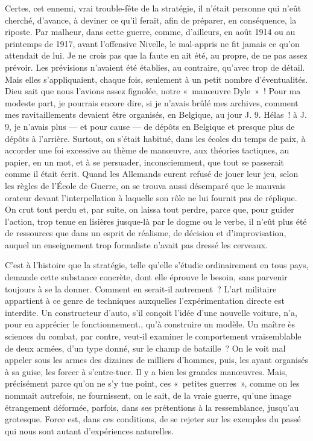 \documentclass[french,twoside]{book} %
\begin{document}
Certes, cet ennemi, vrai trouble-fête de la stratégie, il n’était personne qui n’eût cherché, d’avance, à deviner ce qu’il ferait, afin de préparer, en conséquence, la riposte. Par malheur, dans cette guerre, comme, d’ailleurs, en août 1914 ou au printemps de 1917, avant l’offensive Nivelle, le mal-appris ne fit jamais ce qu’on attendait de lui. Je ne crois pas que la faute en ait été, au propre, de ne pas assez prévoir. Les prévisions n’avaient été établies, au contraire, qu’avec trop de détail. Mais elles s’appliquaient, chaque fois, seulement à un petit nombre d’éventualités. Dieu sait que nous l’avions assez fignolée, notre « manœuvre Dyle » ! Pour ma modeste part, je pourrais encore dire, si je n’avais brûlé mes archives, comment mes ravitaillements devaient être organisés, en Belgique, au jour J. 9. Hélas ! à J. 9, je n’avais plus — et pour cause — de dépôts en Belgique et presque plus de dépôts à l’arrière. Surtout, on s’était habitué, dans les écoles du temps de paix, à accorder une foi excessive au   thème de manœuvre, aux théories tactiques, au papier, en un mot, et à se persuader, inconsciemment, que tout se passerait comme il était écrit. Quand les Allemands eurent refusé de jouer leur jeu, selon les règles de l’École de Guerre, on se trouva aussi désemparé que le mauvais orateur devant l’interpellation à laquelle son rôle ne lui fournit pas de réplique. On crut tout perdu et, par suite, on laissa tout perdre, parce que, pour guider l’action, trop tenue en lisières jusque-là par le dogme ou le verbe, il n’eût plus été de ressources que dans un esprit de réalisme, de décision et d’improvisation, auquel un enseignement trop formaliste n’avait pas dressé les cerveaux.\par
C’est à l’histoire que la stratégie, telle qu’elle s’étudie ordinairement en tous pays, demande cette substance concrète, dont elle éprouve le besoin, sans parvenir toujours à se la donner. Comment en serait-il autrement ? L’art militaire appartient à ce genre de techniques auxquelles l’expérimentation directe est interdite. Un constructeur d’auto, s’il conçoit l’idée d’une nouvelle voiture, n’a, pour en apprécier le fonctionnement., qu’à construire un modèle. Un maître ès sciences du combat, par contre, veut-il examiner le comportement vraisemblable de deux armées, d’un type donné, sur le champ de bataille ? On le voit mal appeler sous les armes des dizaines de milliers d’hommes, puis, les ayant organisés à sa guise, les forcer à s’entre-tuer. Il y a bien les grandes manœuvres. Mais, précisément parce qu’on ne s’y tue point, ces « petites guerres », comme on les nommait autrefois, ne fournissent, on le sait, de la vraie guerre, qu’une image étrangement déformée, parfois, dans ses prétentions à la ressemblance, jusqu’au grotesque. Force est, dans ces conditions, de se rejeter sur les exemples du passé qui nous sont autant d’expériences naturelles.\par
\end{document}
